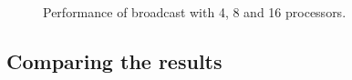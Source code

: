 \begin{figure}[h]
    \caption{Performance of broadcast with 4, 8 and 16 processors.}
    \label{PCM-mpi-3}
\end{figure}

\clearpage




\subsection{Comparing the results}